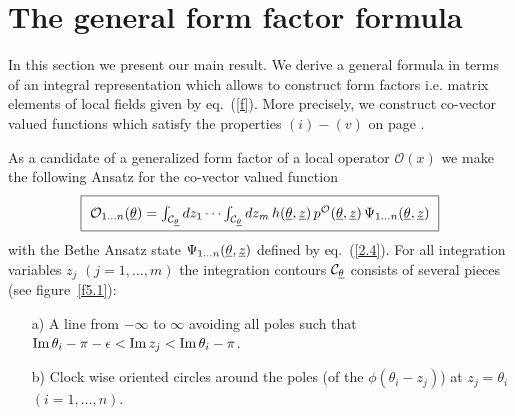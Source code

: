 \documentclass[a4paper,a4paper]{article}
\begin{document}
\section{The general form factor formula}

\label{s3}

In this section we present our main result. We derive a general formula in
terms of an integral representation which allows to construct form factors
i.e. matrix elements of local fields given by eq.~(\ref{f}). More precisely,
we construct co-vector valued functions which satisfy the properties $%
(i)-(v) $ on page \pageref{pf}.

As a candidate of a generalized form factor of a local operator $\mathcal{O}%
(x)$ we make the following Ansatz for the co-vector valued function 
\begin{equation}
\fbox{$\rule{0in}{0.17in}~\mathcal{O}_{1\dots n}(\underline{\theta })=\int_{%
\mathcal{C}_{\underline{\theta }}}dz_{1}\cdots \int_{\mathcal{C}_{\underline{%
\theta }}}dz_{m}\,h(\underline{\theta },{\underline{z}})\,p^{\mathcal{O}}(%
\underline{\theta },{\underline{z}})\,\Psi _{1\dots n}(\underline{\theta },{%
\underline{z}})~$}  \label{1.2}
\end{equation}
with the Bethe Ansatz state $\Psi _{1\dots n}(\underline{\theta },{%
\underline{z}})$ defined by eq.~(\ref{2.4}). For all integration variables $%
z_{j}$ $(j=1,\dots ,m)$ the integration contours $\mathcal{C}_{\underline{%
\theta }}$ consists of several pieces (see figure~\ref{f5.1}):

\begin{itemize}
\item[a)]  A line from $-\infty $ to $\infty $ avoiding all poles such that $%
\mathop{\rm Im}\theta _{i}-\pi -\epsilon <\mathop{\rm Im}z_{j}<\mathop%
\mathrm{Im}\theta _{i}-\pi $.

\item[b)]  Clock wise oriented circles around the poles (of the $\phi
(\theta _{i}-z_{j})$) at $z_{j}=\theta _{i}$ $(i=1,\dots ,n)$.
\end{itemize}
\end{document}
